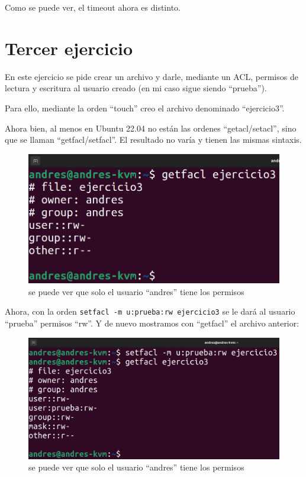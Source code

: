 \documentclass{article}
\begin{document}
Como se puede ver, el timeout ahora es distinto.


\section{Tercer ejercicio}
En este ejercicio se pide crear un archivo y darle, mediante un ACL, permisos de lectura y escritura al usuario creado (en mi caso sigue siendo ``prueba'').

Para ello, mediante la orden ``touch'' creo el archivo denominado ``ejercicio3''.

Ahora bien, al menos en Ubuntu 22.04 no están las ordenes ``getacl/setacl'', sino que se llaman ``getfacl/setfacl''. El resultado no varía y tienen las mismas sintaxis.

\begin{figure}[H]
    \includegraphics[width=\textwidth]{imagenes/getfaclorg.png}
    \caption{se puede ver que solo el usuario ``andres'' tiene los permisos}
\end{figure}


Ahora, con la orden \verb|setfacl -m u:prueba:rw ejercicio3| se le dará al usuario ``prueba'' permisos ``rw''. Y de nuevo mostramos con ``getfacl'' el archivo anterior:

\begin{figure}[H]
    \includegraphics[width=\textwidth]{imagenes/getfaclnew.png}
    \caption{se puede ver que solo el usuario ``andres'' tiene los permisos}
\end{figure}
\end{document}

